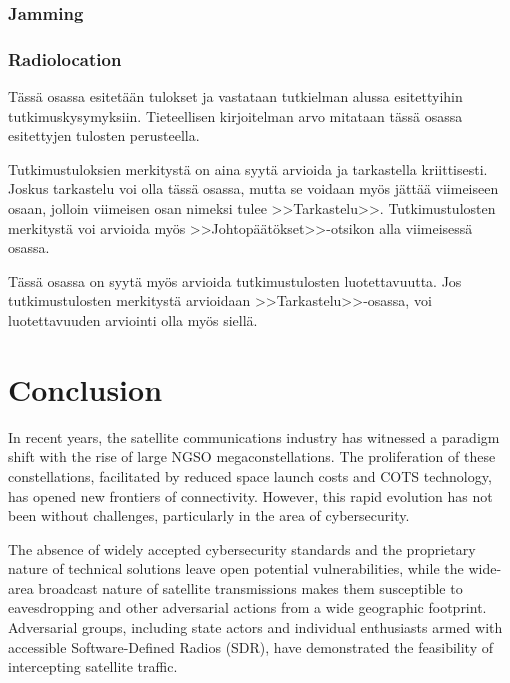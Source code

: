 \documentclass[english, 12pt, a4paper, elec, utf8, a-1b, online]{aaltothesis}
\begin{document}
\subsubsection{Jamming}
\subsubsection{Radiolocation}


T\"ass\"a osassa esitet\"a\"an tulokset ja vastataan tutkielman alussa
esitettyihin tutkimuskysymyksiin.
Tieteellisen kirjoitelman
arvo mitataan t\"ass\"a osassa esitettyjen tulosten perusteella.

Tutkimustuloksien merkityst\"a on aina syyt\"a arvioida ja tarkastella
kriittisesti.  Joskus tarkastelu voi olla t\"ass\"a osassa, mutta se
voidaan my\"os j\"att\"a\"a viimeiseen osaan, jolloin viimeisen osan nimeksi
tulee >>Tarkastelu>>. Tutkimustulosten merkityst\"a voi arvioida my\"os
>>Johtop\"a\"at\"okset>>-otsikon alla viimeisess\"a osassa.

T\"ass\"a osassa on syyt\"a my\"os arvioida tutkimustulosten luotettavuutta.
Jos tutkimustulosten merkityst\"a arvioidaan >>Tarkastelu>>-osassa,
voi luotettavuuden arviointi olla my\"os siell\"a.

\clearpage

\section{Conclusion}

In recent years, the satellite communications industry has witnessed a paradigm shift with the rise of large NGSO megaconstellations.
The proliferation of these constellations, facilitated by reduced space launch costs and COTS technology, has opened new frontiers of connectivity.
However, this rapid evolution has not been without challenges, particularly in the area of cybersecurity.

The absence of widely accepted cybersecurity standards and the proprietary nature of technical solutions leave open potential vulnerabilities, while the wide-area broadcast nature of satellite transmissions makes them susceptible to eavesdropping and other adversarial actions from a wide geographic footprint. Adversarial groups, including state actors and individual enthusiasts armed with accessible Software-Defined Radios (SDR), have demonstrated the feasibility of intercepting satellite traffic.
\end{document}
